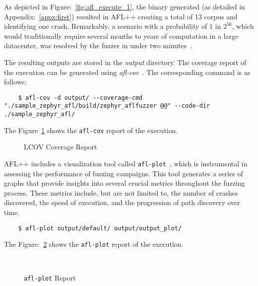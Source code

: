 As depicted in Figure:~\ref{fig:afl_execute_1}, the binary generated
(as detailed in Appendix:~\ref{appx:first}) resulted in AFL++ creating a total of
13 corpus and identifying one crash. Remarkably, a scenario with a
probability of \(1\) in \(2^{56}\), which would traditionally
require several months to years of computation in a large datacenter,
was resolved by the fuzzer in under two minutes~\cite{FuzzingE54:online}.

The resulting outputs are stored in the \textit{output} directory.
The coverage report of the execution can be generated using \textit{afl-cov}~\cite{GitHubmr91:online}.
The corresponding command is as follows:

\begin{verbatim}
    $ afl-cov -d output/ --coverage-cmd "./sample_zephyr_afl/build/zephyr_aflfuzzer @@" --code-dir ./sample_zephyr_afl/
\end{verbatim}

The Figure~\ref{fig:afl_cov} shows the \texttt{afl-cov} report of the execution.
\begin{figure}[H]
    \centering
    {}
    \caption{LCOV Coverage Report~\cite{UbuntuMa97:online}}\label{fig:afl_cov}
\end{figure}

AFL++ includes a visualization tool called \texttt{afl-plot}~\cite{AFLFunct92:online},
which is instrumental in assessing the performance of fuzzing campaigns.
This tool generates a series of graphs that provide insights into several
crucial metrics throughout the fuzzing process. These metrics include,
but are not limited to, the number of crashes discovered,
the speed of execution, and the progression of path discovery over time.

\begin{verbatim}
    $ afl-plot output/default/ output/output_plot/
\end{verbatim}

The Figure:~\ref{fig:afl_plot} shows the \texttt{afl-plot} report of the execution.
\begin{figure}[H]
    \centering
    {}
    \caption{\texttt{afl-plot} Report}~\label{fig:afl_plot}
\end{figure}

